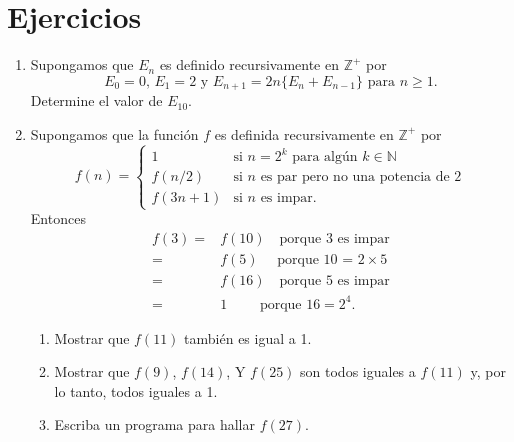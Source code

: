 \documentclass[12pt, a4paper]{book}
\begin{document}
\section{Ejercicios} %
\begin{enumerate}
    \item Supongamos que $E_n$ es definido recursivamente en $\mathds{Z}^+$ por $$E_0=0,\, E_1=2\,\, \text{y} \,\,E_{n+1}=2n\{E_n+E_{n-1}\}\,\, \text{para} \,\, n\geq 1.$$ Determine el valor de $E_{10}$.
    \item Supongamos que la función $f$ es definida recursivamente en $\mathds{Z}^+$ por \[
f(n)=\begin{cases} 
1 & \text{si }n=2^k\text{ para algún }k \in \mathds{N}\\ f(n/2) & \text{si }n\text{ es par pero no una potencia de 2} \\ f(3n+1) & \text{si }n\text{ es impar.}
\end{cases}
\]
Entonces 
\begin{align*}
  f(3)=&f(10)\quad \text{porque 3 es impar} \\
  =&f(5)\quad \text{  porque 10 = 2} \times 5\\
  =&f(16)\quad \text{porque 5 es impar}\\
  =&1\quad\quad\text{ porque 16} = 2^4.
\end{align*}

\begin{enumerate}
    \item Mostrar que $f(11)$ también es igual a 1.
    \item Mostrar que $f(9)$, $f(14)$, Y $f(25)$ son todos iguales a $f(11)$ y, por lo tanto, todos iguales a 1.
    \item Escriba un programa para hallar $f(27)$.
\end{enumerate}


\end{enumerate}
\end{document}
